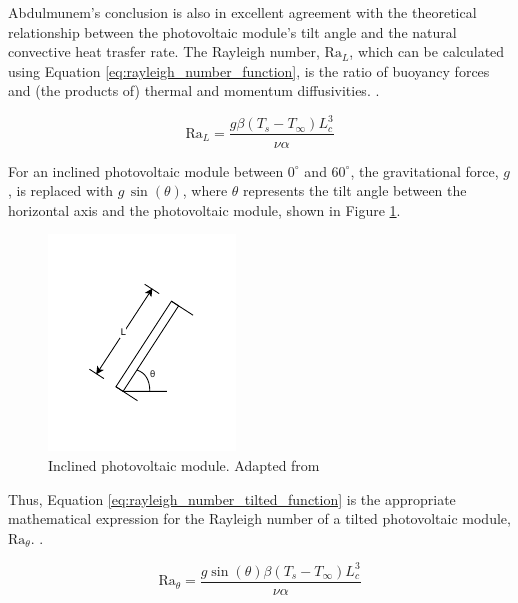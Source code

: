 Abdulmunem's conclusion is also in excellent agreement with the theoretical relationship between the photovoltaic module's tilt angle and the natural convective heat trasfer rate. The Rayleigh number, $\text{Ra}_L$, which can be calculated using Equation \ref{eq:rayleigh_number_function}, is the ratio of buoyancy forces and (the products of) thermal and momentum diffusivities. \cite{Cengel2014NaturalConvection}.

\begin{equation}
    \text{Ra}_L = \frac{g\beta(T_s-T_\infty)L_c^3}{\nu\alpha}
    \label{eq:rayleigh_number_function}
\end{equation}

For an inclined photovoltaic module between $0^\circ$ and $60^\circ$, the gravitational force, $g$, is replaced with $g\,\sin(\theta)$, where $\theta$ represents the tilt angle between the horizontal axis and the photovoltaic module, shown in Figure \ref{fig:inclined_plate}.

\begin{figure}[H]
    \centering
    \includegraphics[width=0.5\linewidth, trim=0 20 0 20, clip]{Figures/inclined_plate.pdf}
    \caption{Inclined photovoltaic module. Adapted from \cite{Cengel2014NaturalConvection}}
    \label{fig:inclined_plate}
\end{figure}

Thus, Equation \ref{eq:rayleigh_number_tilted_function} is the appropriate mathematical expression for the Rayleigh number of a tilted photovoltaic module, $\text{Ra}_\theta$. \cite{Cengel2014NaturalConvection}.

\begin{equation}
    \text{Ra}_\theta = \frac{g\sin(\theta)\beta(T_s-T_\infty)L_c^3}{\nu\alpha}
    \label{eq:rayleigh_number_tilted_function}
\end{equation}

